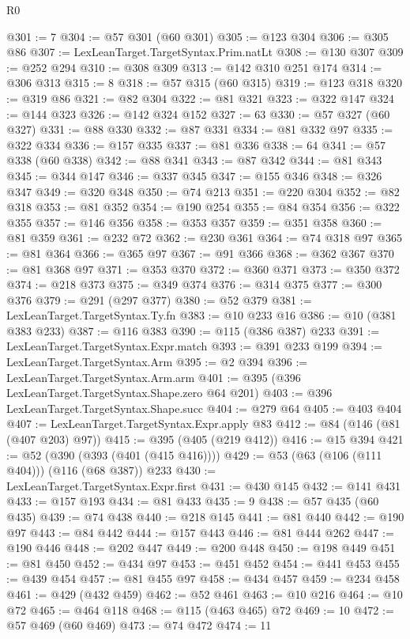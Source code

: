 \begin{lexlean}{R0}
\begin{coremodule}
@301 := 7
@304 := @57 @301 (@60 @301)
@305 := @123 @304
@306 := @305 @86
@307 := LexLeanTarget.TargetSyntax.Prim.natLt
@308 := @130 @307
@309 := @252 @294
@310 := @308 @309
@313 := @142 @310 @251 @174
@314 := @306 @313
@315 := 8
@318 := @57 @315 (@60 @315)
@319 := @123 @318
@320 := @319 @86
@321 := @82 @304
@322 := @81 @321
@323 := @322 @147
@324 := @144 @323
@326 := @142 @324 @152
@327 := 63
@330 := @57 @327 (@60 @327)
@331 := @88 @330
@332 := @87 @331
@334 := @81 @332 @97
@335 := @322 @334
@336 := @157 @335
@337 := @81 @336
@338 := 64
@341 := @57 @338 (@60 @338)
@342 := @88 @341
@343 := @87 @342
@344 := @81 @343
@345 := @344 @147
@346 := @337 @345
@347 := @155 @346
@348 := @326 @347
@349 := @320 @348
@350 := @74 @213
@351 := @220 @304
@352 := @82 @318
@353 := @81 @352
@354 := @190 @254
@355 := @84 @354
@356 := @322 @355
@357 := @146 @356
@358 := @353 @357
@359 := @351 @358
@360 := @81 @359
@361 := @232 @72
@362 := @230 @361
@364 := @74 @318 @97
@365 := @81 @364
@366 := @365 @97
@367 := @91 @366
@368 := @362 @367
@370 := @81 @368 @97
@371 := @353 @370
@372 := @360 @371
@373 := @350 @372
@374 := @218 @373
@375 := @349 @374
@376 := @314 @375
@377 := @300 @376
@379 := @291 (@297 @377)
@380 := @52 @379
@381 := LexLeanTarget.TargetSyntax.Ty.fn
@383 := @10 @233 @16
@386 := @10 (@381 @383 @233)
@387 := @116 @383
@390 := @115 (@386 @387) @233
@391 := LexLeanTarget.TargetSyntax.Expr.match
@393 := @391 @233 @199
@394 := LexLeanTarget.TargetSyntax.Arm
@395 := @2 @394
@396 := LexLeanTarget.TargetSyntax.Arm.arm
@401 := @395 (@396 LexLeanTarget.TargetSyntax.Shape.zero @64 @201)
@403 := @396 LexLeanTarget.TargetSyntax.Shape.succ
@404 := @279 @64
@405 := @403 @404
@407 := LexLeanTarget.TargetSyntax.Expr.apply @83
@412 := @84 (@146 (@81 (@407 @203) @97))
@415 := @395 (@405 (@219 @412))
@416 := @15 @394
@421 := @52 (@390 (@393 (@401 (@415 @416))))
@429 := @53 (@63 (@106 (@111 @404))) (@116 (@68 @387)) @233
@430 := LexLeanTarget.TargetSyntax.Expr.first
@431 := @430 @145
@432 := @141 @431
@433 := @157 @193
@434 := @81 @433
@435 := 9
@438 := @57 @435 (@60 @435)
@439 := @74 @438
@440 := @218 @145
@441 := @81 @440
@442 := @190 @97
@443 := @84 @442
@444 := @157 @443
@446 := @81 @444 @262
@447 := @190 @446
@448 := @202 @447
@449 := @200 @448
@450 := @198 @449
@451 := @81 @450
@452 := @434 @97
@453 := @451 @452
@454 := @441 @453
@455 := @439 @454
@457 := @81 @455 @97
@458 := @434 @457
@459 := @234 @458
@461 := @429 (@432 @459)
@462 := @52 @461
@463 := @10 @216
@464 := @10 @72
@465 := @464 @118
@468 := @115 (@463 @465) @72
@469 := 10
@472 := @57 @469 (@60 @469)
@473 := @74 @472
@474 := 11

\end{coremodule}
\end{lexlean}
